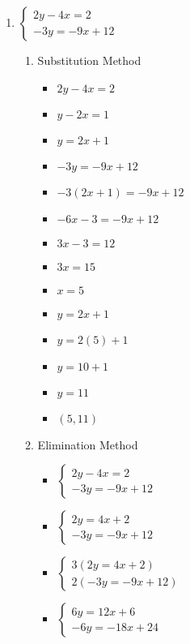 \documentclass{article}
\begin{document}
\begin{enumerate}
\begin{enumerate}
\begin{itemize}
    \end{itemize}
  \end{enumerate}
\item $\left\{ \begin{array}{l}
      2y-4x=2 \\
      -3y=-9x+12 \end{array} \right.$
  \begin{enumerate}
  \item Substitution Method
    \begin{itemize}
    \item $2y-4x=2$
    \item $y-2x=1$
    \item $y=2x+1$
    \item $-3y=-9x+12$
    \item $-3(2x+1)=-9x+12$
    \item $-6x-3=-9x+12$
    \item $3x-3=12$
    \item $3x=15$
    \item $x=5$
    \item $y=2x+1$
    \item $y=2(5)+1$
    \item $y=10+1$
    \item $y=11$
    \item $(5,11)$
    \end{itemize}
  \item Elimination Method
    \begin{itemize}
    \item $\left\{ \begin{array}{l}
          2y-4x=2 \\
          -3y=-9x+12 \end{array} \right.$
    \item $\left\{ \begin{array}{l}
          2y=4x+2 \\
          -3y=-9x+12 \end{array} \right.$
    \item $\left\{ \begin{array}{l}
          3(2y=4x+2) \\
          2(-3y=-9x+12) \end{array} \right.$
    \item $\left\{ \begin{array}{l}
          6y=12x+6 \\
          -6y=-18x+24 \end{array} \right.$

\end{itemize}
\end{enumerate}
\end{enumerate}
\end{document}
